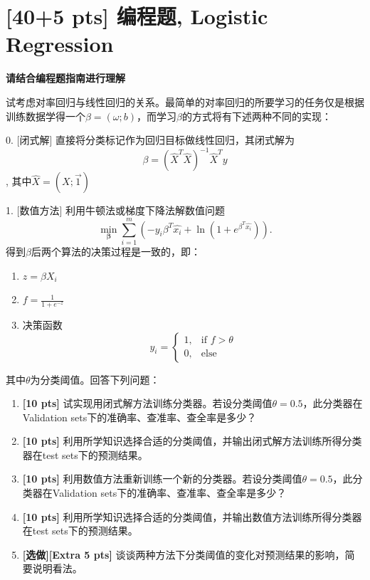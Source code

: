 \documentclass[a4paper,UTF8]{article}
\numberwithin{equation}{section}
\begin{document}
\section{[40+5 pts] 编程题, Logistic Regression}
\textbf{请结合编程题指南进行理解}
\par 试考虑对率回归与线性回归的关系。最简单的对率回归的所要学习的任务仅是根据训练数据学得一个$\beta=(\omega;b)$，而学习$\beta$的方式将有下述两种不同的实现：
\par 0. [闭式解] 直接将分类标记作为回归目标做线性回归，其闭式解为 \begin{equation}
	\beta=({\hat{X}}^T\hat{X})^{-1}\hat{X}^Ty
	\end{equation}, 其中$\hat{X}=(X;\vec{1})$

\par 1. [数值方法] 利用牛顿法或梯度下降法解数值问题
\begin{equation}
	\min_{\mathbf{\beta}} \sum_{i=1}^{m}(-y_i\beta^T\hat{x_i}+\ln (1+e^{\beta^T\hat{x_i}})). 
\end{equation}
得到$\beta$后两个算法的决策过程是一致的，即：
\begin{enumerate}[(1)]
	\item $z=\beta X_{i}$
	\item $f=\frac{1}{1+e^{-z}}$
	\item 决策函数\begin{equation}
		y_{i}=
		\begin{cases}
		1,&\mbox{if $f>\theta$}\\
		0,&\mbox{else}
		\end{cases}
		\end{equation}
	\end{enumerate}
	其中$\theta$为分类阈值。回答下列问题：
	\begin{enumerate}[(1)]
		\item \textbf{[10 pts]} 试实现用闭式解方法训练分类器。若设分类阈值$\theta=0.5$，此分类器在Validation sets下的准确率、查准率、查全率是多少？
		\item \textbf{[10 pts]} 利用所学知识选择合适的分类阈值，并输出闭式解方法训练所得分类器在test sets下的预测结果。
		\item \textbf{[10 pts]} 利用数值方法重新训练一个新的分类器。若设分类阈值$\theta=0.5$，此分类器在Validation sets下的准确率、查准率、查全率是多少？
		\item \textbf{[10 pts]} 利用所学知识选择合适的分类阈值，并输出数值方法训练所得分类器在test sets下的预测结果。
		\item \textbf{[选做][Extra 5 pts]} 谈谈两种方法下分类阈值的变化对预测结果的影响，简要说明看法。
	\end{enumerate}
\end{document}
